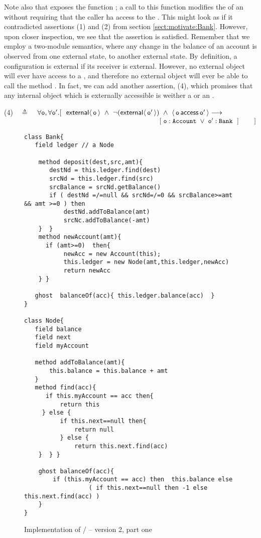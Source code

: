 Note also that  exposes the function ; a call to this function   modifies the  of an  without requiring that the caller ha access to the . This might look as if it contradicted assertions (1) and  (2)
 from section \ref{sect:motivate:Bank}. However, upon closer inspection, we see that the assertion is satisfied. Remember that we employ a two-module semantics, where any change in the balance of an account is observed from one external state, to another external state. By definition, a configuration is external if its receiver is external.  However, no external object will ever have access to a , and therefore no external object will ever be able to call the method . In fact, we can add another assertion, (4), which promises that any internal object which is externally accessible is weither a  or an .

(4)\ \  $\triangleq$\ \ $\forall \prg{o},\forall \prg{o}'.[\ \ \External{ \prg{o}}\  \wedge\ \neg (\External{ \prg{o}'}) \ \wedge\  \CanAccess{\prg{o}}{\prg{o}'}     
    \longrightarrow \ \    \hfill$ \\
  $\strut \hspace{8.3cm} 
  [\    \prg{o}:\prg{Account}\ \vee \ \prg{o}':\prg{Bank}\  \ ]\ \ \  \ \ \ \ ] \hfill $



\begin{figure}[htb]
\begin{lstlisting}
class Bank{
   field ledger // a Node
   
    method deposit(dest,src,amt){
       destNd = this.ledger.find(dest)
       srcNd = this.ledger.find(src)
       srcBalance = srcNd.getBalance()
       if ( destNd =/=null && srcNd=/=0 && srcBalance>=amt && amt >=0 ) then
           destNd.addToBalance(amt)
           srcNc.addToBalance(-amt)           
    }  }     
    method newAccount(amt){
      if (amt>=0)  then{
           newAcc = new Account(this);
           this.ledger = new Node(amt,this.ledger,newAcc)
           return newAcc 
    } }
   
   ghost  balanceOf(acc){ this.ledger.balance(acc)  } 
}

class Node{
   field balance
   field next   
   field myAccount
   
   method addToBalance(amt){
       this.balance = this.balance + amt
   }   
   method find(acc){
      if this.myAccount == acc then{
          return this
     } else { 
          if this.next==null then{
              return null
          } else {
              return this.next.find(acc)
    }  } } 
    
    ghost balanceOf(acc){
        if (this.myAccount == acc) then  this.balance else  
                  ( if this.next==null then -1 else this.next.find(acc) )
    }
}          
\end{lstlisting}
 \vspace*{-7mm}
\caption{Implementation of /  -- version 2, part one}
\label{fig:BanAccImplV2a}
\end{figure}

